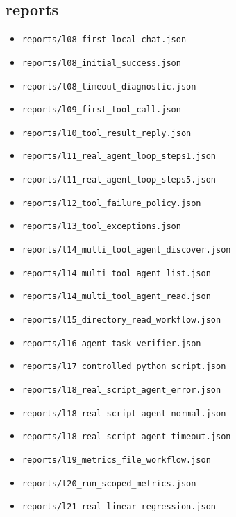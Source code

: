 \subsection{reports}
\begin{itemize}
\item \nolinkurl{reports/l08_first_local_chat.json}
\item \nolinkurl{reports/l08_initial_success.json}
\item \nolinkurl{reports/l08_timeout_diagnostic.json}
\item \nolinkurl{reports/l09_first_tool_call.json}
\item \nolinkurl{reports/l10_tool_result_reply.json}
\item \nolinkurl{reports/l11_real_agent_loop_steps1.json}
\item \nolinkurl{reports/l11_real_agent_loop_steps5.json}
\item \nolinkurl{reports/l12_tool_failure_policy.json}
\item \nolinkurl{reports/l13_tool_exceptions.json}
\item \nolinkurl{reports/l14_multi_tool_agent_discover.json}
\item \nolinkurl{reports/l14_multi_tool_agent_list.json}
\item \nolinkurl{reports/l14_multi_tool_agent_read.json}
\item \nolinkurl{reports/l15_directory_read_workflow.json}
\item \nolinkurl{reports/l16_agent_task_verifier.json}
\item \nolinkurl{reports/l17_controlled_python_script.json}
\item \nolinkurl{reports/l18_real_script_agent_error.json}
\item \nolinkurl{reports/l18_real_script_agent_normal.json}
\item \nolinkurl{reports/l18_real_script_agent_timeout.json}
\item \nolinkurl{reports/l19_metrics_file_workflow.json}
\item \nolinkurl{reports/l20_run_scoped_metrics.json}
\item \nolinkurl{reports/l21_real_linear_regression.json}
\end{itemize}


